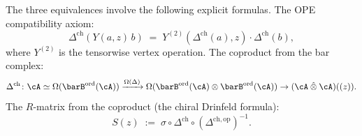 \begin{remark}
\label{rem:chiral-qg-key-formulas}
The three equivalences involve the following explicit formulas.
The OPE compatibility axiom:
\begin{equation}\label{eq:ope-compat}
 \Delta^{\mathrm{ch}}(Y(a,z)\, b)
 \;=\;
 Y^{(2)}(\Delta^{\mathrm{ch}}(a), z)
 \cdot \Delta^{\mathrm{ch}}(b),
\end{equation}
where $Y^{(2)}$ is the tensorwise vertex operation.
The coproduct from the bar complex:
\begin{equation}\label{eq:coprod-from-bar}
 \Delta^{\mathrm{ch}} \colon
 \cA \simeq \Omega(\barB^{\mathrm{ord}}(\cA))
 \xrightarrow{\Omega(\Delta)}
 \Omega(\barB^{\mathrm{ord}}(\cA) \otimes
 \barB^{\mathrm{ord}}(\cA))
 \to (\cA \mathbin{\hat{\otimes}} \cA)((z)).
\end{equation}
The $R$-matrix from the coproduct (the chiral Drinfeld formula):
\begin{equation}\label{eq:r-from-coprod-proof}
 S(z)
 \;:=\; \sigma \circ \Delta^{\mathrm{ch}}
 \circ (\Delta^{\mathrm{ch},\mathrm{op}})^{-1}.
\end{equation}
\end{remark}

